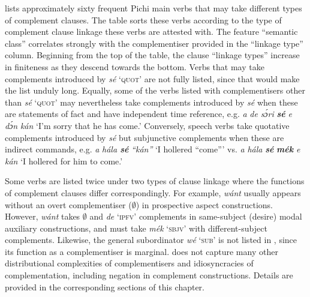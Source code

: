  lists approximately sixty frequent Pichi main verbs that may take different types of complement clauses. The table sorts these verbs according to the type of complement clause linkage these verbs are attested with. The feature “semantic class” correlates strongly with the complementiser provided in the “linkage type” column. Beginning from the top of the table, the clause “linkage types” increase in finiteness as they descend towards the bottom. Verbs that may take complements introduced by \textit{sé} ‘\textsc{quot}’ are not fully listed, since that would make the list unduly long. Equally, some of the verbs listed with complementisers other than \textit{sé} ‘\textsc{quot’} may nevertheless take complements introduced by \textit{sé} when these are statements of fact and have independent time reference, e.g. \textit{a} \textit{de} \textit{sɔ́ri} \textbf{\textit{sé}} \textit{e} \textit{dɔ́n} \textit{kán} ‘I’m sorry that he has come.’ Conversely, speech verbs take quotative complements introduced by \textit{sé} but subjunctive complements when these are indirect commands, e.g. \textit{a} \textit{hála \textbf{sé}} \textit{“kán”} ‘I hollered “come”’ vs. \textit{a} \textit{hála} \textit{\textbf{sé}} \textbf{\textit{mék}} \textit{e} \textit{kán} ‘I hollered for him to come.’


Some verbs are listed twice under two types of clause linkage where the functions of complement clauses differ correspondingly. For example, \textit{wánt} usually appears without an overt complementiser (${\emptyset}$) in prospective aspect constructions. However, \textit{wánt} takes ${\emptyset}$ and \textit{de} \textsc{‘ipfv’} complements in same-subject (desire) modal auxiliary constructions, and must take \textit{mék} \textsc{‘sbjv’} with different-subject complements. Likewise, the general subordinator \textit{wé} \textsc{‘sub’} is not listed in , since its function as a complementiser is marginal.  does not capture many other distributional complexities of complementisers and idiosyncracies of complementation, including negation in complement constructions. Details are provided in the corresponding sections of this chapter. 


